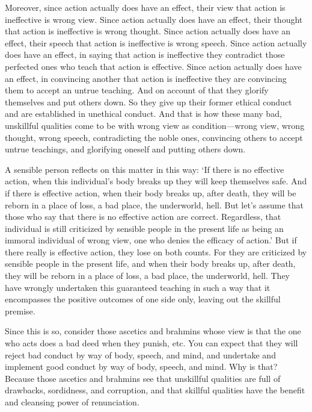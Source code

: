 \documentclass[12pt,openany]{book}%
\begin{document}
Moreover, since action actually does have an effect, their view that action is ineffective is wrong view. Since action actually does have an effect, their thought that action is ineffective is wrong thought. Since action actually does have an effect, their speech that action is ineffective is wrong speech. Since action actually does have an effect, in saying that action is ineffective they contradict those perfected ones who teach that action is effective. Since action actually does have an effect, in convincing another that action is ineffective they are convincing them to accept an untrue teaching. And on account of that they glorify themselves and put others down. So they give up their former ethical conduct and are established in unethical conduct. And that is how these many bad, unskillful qualities come to be with wrong view as condition—wrong view, wrong thought, wrong speech, contradicting the noble ones, convincing others to accept untrue teachings, and glorifying oneself and putting others down. 

A sensible person reflects on this matter in this way: ‘If there is no effective action, when this individual’s body breaks up they will keep themselves safe. And if there is effective action, when their body breaks up, after death, they will be reborn in a place of loss, a bad place, the underworld, hell. But let’s assume that those who say that there is no effective action are correct. Regardless, that individual is still criticized by sensible people in the present life as being an immoral individual of wrong view, one who denies the efficacy of action.’ But if there really is effective action, they lose on both counts. For they are criticized by sensible people in the present life, and when their body breaks up, after death, they will be reborn in a place of loss, a bad place, the underworld, hell. They have wrongly undertaken this guaranteed teaching in such a way that it encompasses the positive outcomes of one side only, leaving out the skillful premise. 

Since this is so, consider those ascetics and brahmins whose view is that the one who acts does a bad deed when they punish, etc. You can expect that they will reject bad conduct by way of body, speech, and mind, and undertake and implement good conduct by way of body, speech, and mind. Why is that? Because those ascetics and brahmins see that unskillful qualities are full of drawbacks, sordidness, and corruption, and that skillful qualities have the benefit and cleansing power of renunciation. 
\end{document}
